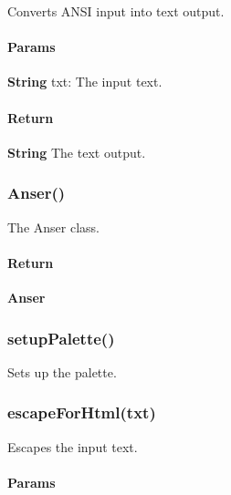 Converts A\+N\+SI input into text output.

\paragraph*{Params}


\begin{DoxyItemize}
\item {\bfseries String} {\ttfamily txt}\+: The input text.
\end{DoxyItemize}

\paragraph*{Return}


\begin{DoxyItemize}
\item {\bfseries String} The text output.
\end{DoxyItemize}

\subsubsection*{{\ttfamily Anser()}}

The {\ttfamily Anser} class.

\paragraph*{Return}


\begin{DoxyItemize}
\item {\bfseries Anser}
\end{DoxyItemize}

\subsubsection*{{\ttfamily setup\+Palette()}}

Sets up the palette.

\subsubsection*{{\ttfamily escape\+For\+Html(txt)}}

Escapes the input text.

\paragraph*{Params}


